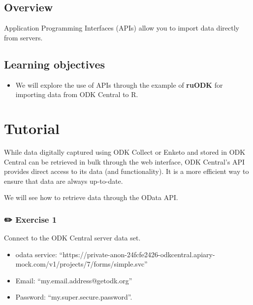 \documentclass[
  letterpaper,
  DIV=11,
  numbers=noendperiod]{scrreprt}
\providecommand{\tightlist}{%
  \setlength{\itemsep}{0pt}\setlength{\parskip}{0pt}}\usepackage{longtable,booktabs,array}
\begin{document}
\hypertarget{overview-8}{%
\subsection{Overview}\label{overview-8}}

Application Programming Interfaces (APIs) allow you to import data
directly from servers.

\hypertarget{learning-objectives-9}{%
\subsection{Learning objectives}\label{learning-objectives-9}}

\begin{itemize}
\tightlist
\item
  We will explore the use of APIs through the example of \textbf{ruODK}
  for importing data from ODK Central to R.
\end{itemize}

\hypertarget{tutorial}{%
\section{Tutorial}\label{tutorial}}

While data digitally captured using ODK Collect or Enketo and stored in
ODK Central can be retrieved in bulk through the web interface, ODK
Central's API provides direct access to its data (and functionality). It
is a more efficient way to ensure that data are always up-to-date.

We will see how to retrieve data through the OData API.

\hypertarget{exercise-1-2}{%
\subsubsection{\texorpdfstring{{✏️} Exercise
1}{✏️ Exercise 1}}\label{exercise-1-2}}

Connect to the ODK Central server data set.

\begin{itemize}
\tightlist
\item
  odata service:
  ``https://private-anon-24fcfe2426-odkcentral.apiary-mock.com/v1/projects/7/forms/simple.svc''
\item
  Email: ``my.email.address@getodk.org''
\item
  Password: ``my.super.secure.password''.
\end{itemize}
\end{document}
